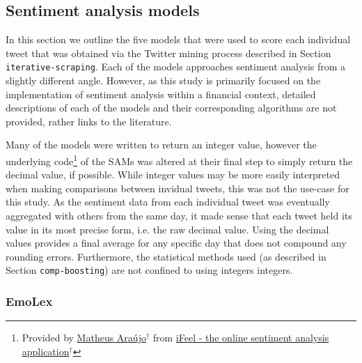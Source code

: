 \documentclass{article}
\begin{document}
\subsection{Sentiment analysis models \label{sent-anal}}
\label{sec-1-4}

In this section we outline the five models that were used to score each individual tweet that was obtained via the Twitter mining process described in Section \texttt{iterative-scraping}. Each of the models approaches sentiment analysis from a slightly different angle. However, as this study is primarily focused on the implementation of sentiment analysis within a financial context, detailed descriptions of each of the models and their corresponding algorithms are not provided, rather links to the literature.

Many of the models were written to return an integer value, however the underlying code\footnote{Provided by \href{https://matheusaraujo.com/my-self/#mainpublications}{Matheus Araújo$^{\dag{}}$} from \href{http://blackbird.dcc.ufmg.br:1210/}{iFeel - the online sentiment analysis application$^{\dag{}}$}} of the SAMs was altered at their final step to simply return the decimal value, if possible. While integer values may be more easily interpreted when making comparisons between invidual tweets, this was not the use-case for this study. As the sentiment data from each individual tweet was eventually aggregated with others from the same day, it made sense that each tweet held its value in its most precise form, i.e. the raw decimal value. Using the decimal values provides a final average for any specific day that does not compound any rounding errors. Furthermore, the statistical methods used (as described in Section \texttt{comp-boosting}) are not confined to using integers integers.


\subsubsection{EmoLex \label{emolex}}
\label{sec-1-4-1}
\end{document}
